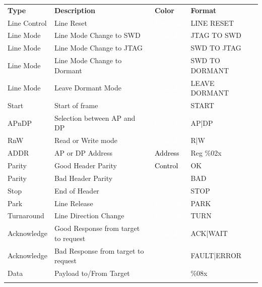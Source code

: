\begin{tabularx}{16cm}{lllX}
\thickhline
\textbf{Type} & \textbf{Description} & \textbf{Color} & \textbf{Format} \\
\thickhline
Line Control & Line Reset & \cellcolor{preamble}\textcolor{white}{Preamble} & LINE RESET \\
\thickhline
Line Mode & Line Mode Change to SWD & \cellcolor{control}\textcolor{white}{Control} & JTAG TO SWD \\
\thickhline
Line Mode & Line Mode Change to JTAG & \cellcolor{control}\textcolor{white}{Control} & SWD TO JTAG \\
\thickhline
Line Mode & Line Mode Change to Dormant & \cellcolor{control}\textcolor{white}{Control} & SWD TO DORMANT \\
\thickhline
Line Mode & Leave Dormant Mode & \cellcolor{control}\textcolor{white}{Control} & LEAVE DORMANT \\
\thickhline
Start & Start of frame & \cellcolor{preamble}\textcolor{white}{Preamble} & START \\
\thickhline
APnDP & Selection between AP and DP & \cellcolor{control}\textcolor{white}{Control} & AP|DP  \\
\thickhline
RnW & Read or Write mode & \cellcolor{control}\textcolor{white}{Control} & R|W  \\
\thickhline
ADDR & AP or DP Address & \cellcolor{address}\textcolor{black}{Address} & Reg \%02x \\
\thickhline
Parity & Good Header Parity & \cellcolor{green}\textcolor{black}{Control} & OK  \\
\thickhline
Parity & Bad Header Parity & \cellcolor{red}\textcolor{white}{Control} & BAD  \\
\thickhline
Stop & End of Header & \cellcolor{preamble}\textcolor{white}{Preamble} & STOP \\
\thickhline
Park & Line Release & \cellcolor{preamble}\textcolor{white}{Preamble} & PARK \\
\thickhline
Turnaround & Line Direction Change & \cellcolor{preamble}\textcolor{white}{Preamble} & TURN \\
\thickhline
Acknowledge & Good Response from target to request & \cellcolor{control}\textcolor{white}{Control} & ACK|WAIT    \\
\thickhline
Acknowledge & Bad Response from target to request & \cellcolor{control}\textcolor{white}{Control} & FAULT|ERROR    \\
\thickhline
Data & Payload to/From Target & \cellcolor{data}\textcolor{white}{Data} & \%08x \\
\thickhline

\thickhline
\end{tabularx}

